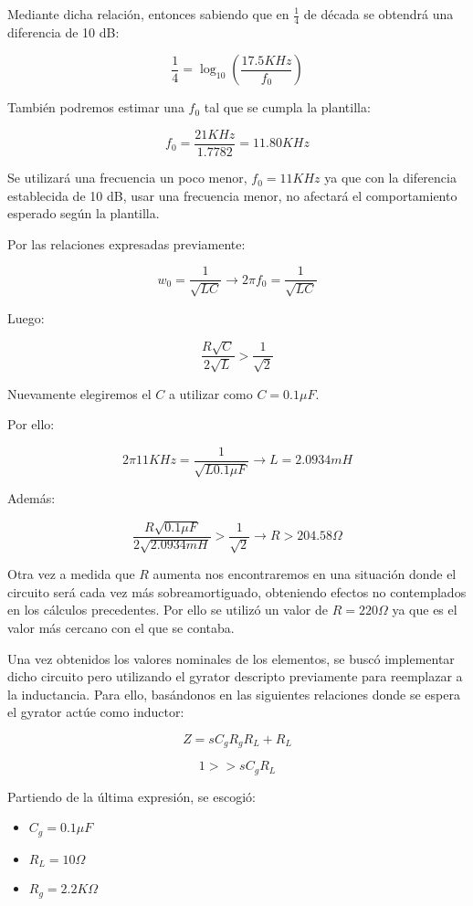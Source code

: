 Mediante dicha relación, entonces sabiendo que en $\frac{1}{4}$ de década se obtendrá una diferencia de 10 dB:

$$\frac{1}{4}=\log_{10}(\frac{17.5KHz}{f_0})$$

También podremos estimar una $f_0$ tal que se cumpla la plantilla:

$$f_0 = \frac{21KHz}{1.7782} = 11.80 KHz$$

Se utilizará una frecuencia un poco menor, $f_0=11 KHz$ ya que con la diferencia establecida de 10 dB, usar una frecuencia menor, no afectará el comportamiento 
esperado según la plantilla.

Por las relaciones expresadas previamente:

$$w_0=\frac{1}{\sqrt{LC}} \longrightarrow 2\pi f_0=\frac{1}{\sqrt{LC}}$$

Luego:

$$\frac{R\sqrt{C}}{2\sqrt{L}} > \frac{1}{\sqrt{2}}$$

Nuevamente elegiremos el $C$ a utilizar como $C=0.1\mu F$. 

Por ello:

$$2\pi 11KHz=\frac{1}{\sqrt{L0.1 \mu F}} \longrightarrow L = 2.0934 mH$$

Además:

$$\frac{R\sqrt{0.1\mu F}}{2\sqrt{2.0934mH}} > \frac{1}{\sqrt{2}} \longrightarrow R > 204.58 \Omega $$

Otra vez a medida que $R$ aumenta nos encontraremos en una situación donde el circuito será
cada vez más sobreamortiguado, obteniendo efectos no contemplados en los cálculos precedentes. 
Por ello se utilizó un valor de $R= 220 \Omega$ ya que es el valor más cercano con el que se contaba.

Una vez obtenidos los valores nominales de los elementos, se buscó implementar dicho circuito pero utilizando el gyrator descripto previamente
para reemplazar a la inductancia. Para ello, basándonos 
en las siguientes relaciones donde se espera el gyrator actúe como inductor:

$$Z=sC_gR_gR_L+R_L$$

$$1 >> sC_gR_L$$

Partiendo de la última expresión, se escogió:

\begin{itemize}
	\item $C_g=0.1 \mu F$
	\item $R_L=10 \Omega$
	\item $R_g=2.2K \Omega$
\end{itemize}

